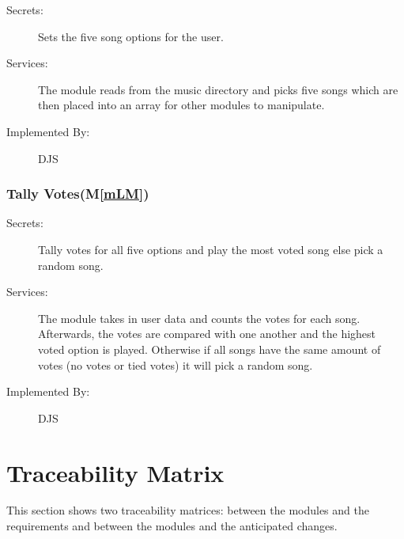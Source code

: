 \documentclass[12pt, titlepage]{article}
\newcommand{\mref}[1]{M\ref{#1}}
\begin{document}
\begin{description}
\item[Secrets:] Sets the five song options for the user.
\item[Services:]The module reads from the music directory and picks five songs which are then placed into an array for other modules to manipulate.
\item[Implemented By:] DJS
\end{description}


\subsubsection{Tally Votes(\mref{mLM})}


\begin{description}
\item[Secrets:] Tally votes for all five options and play the most voted song else pick a random song.
\item[Services:]The module takes in user data and counts the votes for each song. Afterwards, the votes are compared with one another and the highest voted option is played. Otherwise if all songs have the same amount of votes (no votes or tied votes) it will pick a random song.
\item[Implemented By:] DJS
\end{description}






\section{Traceability Matrix} \label{SecTM}


This section shows two traceability matrices: between the modules and the
requirements and between the modules and the anticipated changes.
\end{document}
